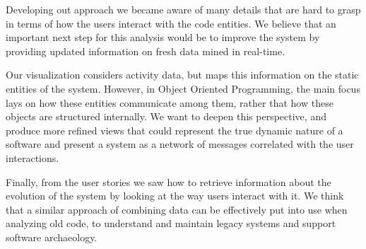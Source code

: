 Developing out approach we became aware of many details that are hard to grasp in terms of how the users interact with the code entities. We believe that an important next step for this analysis would be to improve the system by providing updated information on fresh data mined in real-time.

Our visualization considers activity data, but maps this information on the static entities of the system. However, in Object Oriented Programming, the main focus lays on how these entities communicate among them, rather that how these objects are structured internally. We want to deepen this perspective, and produce more refined views that could represent the true dynamic nature of a software and present a system as a network of messages correlated with the user interactions.

Finally, from the user stories we saw how to retrieve information about the evolution of the system by looking at the way users interact with it. We think that a similar approach of combining data can be effectively put into use when analyzing old code, to understand and maintain legacy systems and support software archaeology.



%

%
%

%